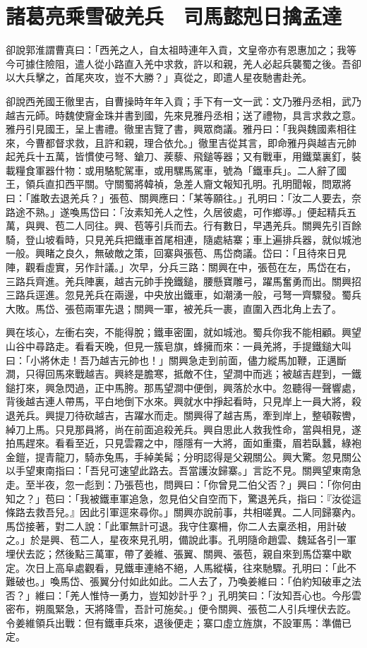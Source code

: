 
\chapter{諸葛亮乘雪破羌兵　司馬懿剋日擒孟達}

卻說郭淮謂曹真曰：「西羌之人，自太祖時連年入貢，文皇帝亦有恩惠加之；我等今可據住險阻，遣人從小路直入羌中求救，許以和親，羌人必起兵襲蜀之後。吾卻以大兵擊之，首尾夾攻，豈不大勝？」真從之，即遣人星夜馳書赴羌。

卻說西羌國王徹里吉，自曹操時年年入貢；手下有一文一武：文乃雅丹丞相，武乃越吉元師。時魏使齎金珠并書到國，先來見雅丹丞相；送了禮物，具言求救之意。雅丹引見國王，呈上書禮。徹里吉覽了書，興眾商議。雅丹曰：「我與魏國素相往來，今曹都督求救，且許和親，理合依允。」徹里吉從其言，即命雅丹與越吉元帥起羌兵十五萬，皆慣使弓弩、鎗刀、蒺藜、飛鎚等器；又有戰車，用鐵葉裏釘，裝載糧食軍器什物：或用駱駝駕車，或用騾馬駕車，號為「鐵車兵」。二人辭了國王，領兵直扣西平關。守關蜀將韓禎，急差人齎文報知孔明。孔明聞報，問眾將曰：「誰敢去退羌兵？」張苞、關興應曰：「某等願往。」孔明曰：「汝二人要去，奈路途不熟。」遂喚馬岱曰：「汝素知羌人之性，久居彼處，可作鄉導。」便起精兵五萬，與興、苞二人同往。興、苞等引兵而去。行有數日，早遇羌兵。關興先引百餘騎，登山坡看時，只見羌兵把鐵車首尾相連，隨處結寨；車上遍排兵器，就似城池一般。興睹之良久，無破敵之策，回寨與張苞、馬岱商議。岱曰：「且待來日見陣，觀看虛實，另作計議。」次早，分兵三路：關興在中，張苞在左，馬岱在右，三路兵齊進。羌兵陣裏，越吉元帥手挽鐵鎚，腰懸寶雕弓，躍馬奮勇而出。關興招三路兵逕進。忽見羌兵在兩邊，中央放出鐵車，如潮湧一般，弓弩一齊驟發。蜀兵大敗。馬岱、張苞兩軍先退；關興一軍，被羌兵一裹，直圍入西北角上去了。

興在垓心，左衝右突，不能得脫；鐵車密圍，就如城池。蜀兵你我不能相顧。興望山谷中尋路走。看看天晚，但見一簇皂旗，蜂擁而來：一員羌將，手提鐵鎚大叫曰：「小將休走！吾乃越吉元帥也！」關興急走到前面，儘力縱馬加鞭，正邁斷澗，只得回馬來戰越吉。興終是膽寒，抵敵不住，望澗中而逃；被越吉趕到，一鐵鎚打來，興急閃過，正中馬胯。那馬望澗中便倒，興落於水中。忽聽得一聲響處，背後越吉連人帶馬，平白地倒下水來。興就水中掙起看時，只見岸上一員大將，殺退羌兵。興提刀待砍越吉，吉躍水而走。關興得了越吉馬，牽到岸上，整頓鞍轡，綽刀上馬。只見那員將，尚在前面追殺羌兵。興自思此人救我性命，當與相見，遂拍馬趕來。看看至近，只見雲霧之中，隱隱有一大將，面如重棗，眉若臥蠶，綠袍金鎧，提青龍刀，騎赤兔馬，手綽美髯；分明認得是父親關公。興大驚。忽見關公以手望東南指曰：「吾兒可速望此路去。吾當護汝歸寨。」言訖不見。關興望東南急走。至半夜，忽一彪到：乃張苞也，問興曰：「你曾見二伯父否？」興曰：「你何由知之？」苞曰：「我被鐵車軍追急，忽見伯父自空而下，驚退羌兵，指曰：『汝從這條路去救吾兒。』因此引軍逕來尋你。」關興亦說前事，共相嗟異。二人同歸寨內。馬岱接著，對二人說：「此軍無計可退。我守住寨柵，你二人去稟丞相，用計破之。」於是興、苞二人，星夜來見孔明，備說此事。孔明隨命趙雲、魏延各引一軍埋伏去訖；然後點三萬軍，帶了姜維、張翼、關興、張苞，親自來到馬岱寨中歇定。次日上高阜處觀看，見鐵車連絡不絕，人馬縱橫，往來馳驟。孔明曰：「此不難破也。」喚馬岱、張翼分付如此如此。二人去了，乃喚姜維曰：「伯約知破車之法否？」維曰：「羌人惟恃一勇力，豈知妙計乎？」孔明笑曰：「汝知吾心也。今彤雲密布，朔風緊急，天將降雪，吾計可施矣。」便令關興、張苞二人引兵埋伏去訖。令姜維領兵出戰：但有鐵車兵來，退後便走；寨口虛立旌旗，不設軍馬：準備已定。

